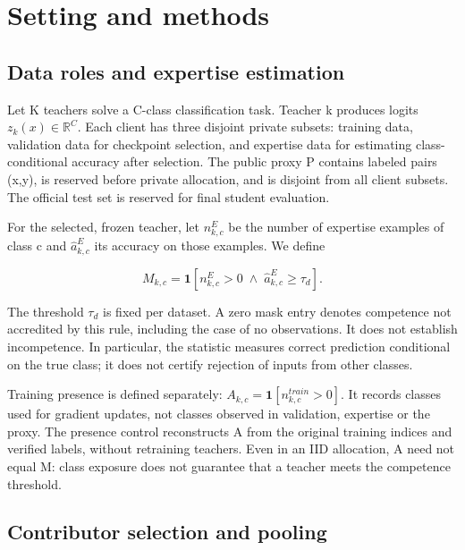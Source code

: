 \hypertarget{setting-and-methods}{%
\section{Setting and methods}\label{setting-and-methods}}

\hypertarget{data-roles-and-expertise-estimation}{%
\subsection{Data roles and expertise estimation}\label{data-roles-and-expertise-estimation}}

Let K teachers solve a C-class classification task. Teacher k produces logits \(z_k(x)\in\mathbb R^C\). Each client has three disjoint private subsets: training data, validation data for checkpoint selection, and expertise data for estimating class-conditional accuracy after selection. The public proxy P contains labeled pairs (x,y), is reserved before private allocation, and is disjoint from all client subsets. The official test set is reserved for final student evaluation.

For the selected, frozen teacher, let \(n^E_{k,c}\) be the number of expertise examples of class c and \(\widehat a^E_{k,c}\) its accuracy on those examples. We define

\[
M_{k,c}=\mathbf{1}\left[n^E_{k,c}>0\;\land\;\widehat a^E_{k,c}\geq\tau_d\right].
\]

The threshold \(\tau_d\) is fixed per dataset. A zero mask entry denotes competence not accredited by this rule, including the case of no observations. It does not establish incompetence. In particular, the statistic measures correct prediction conditional on the true class; it does not certify rejection of inputs from other classes.

Training presence is defined separately: \(A_{k,c}=\mathbf 1[n^{train}_{k,c}>0].\) It records classes used for gradient updates, not classes observed in validation, expertise or the proxy. The presence control reconstructs A from the original training indices and verified labels, without retraining teachers. Even in an IID allocation, A need not equal M: class exposure does not guarantee that a teacher meets the competence threshold.

\hypertarget{contributor-selection-and-pooling}{%
\subsection{Contributor selection and pooling}\label{contributor-selection-and-pooling}}

